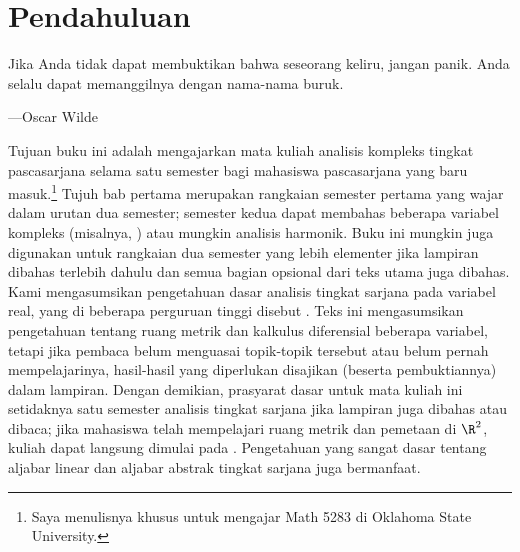 
\chapter*{Pendahuluan} \label{ch:intro}

\begin{myepigraph}
Jika Anda tidak dapat membuktikan bahwa seseorang keliru, jangan panik. Anda selalu dapat memanggilnya dengan nama-nama buruk.

---Oscar Wilde
\end{myepigraph}

Tujuan buku ini adalah mengajarkan mata kuliah analisis kompleks tingkat
pascasarjana selama satu semester bagi mahasiswa pascasarjana yang baru masuk.\footnote{Saya menulisnya khusus untuk mengajar Math 5283 di Oklahoma State University.}
Tujuh bab pertama merupakan rangkaian semester pertama yang wajar dalam
urutan dua semester; semester kedua dapat membahas beberapa variabel kompleks
(misalnya, \cite{scv:book}) atau mungkin analisis harmonik.
Buku ini mungkin juga digunakan untuk rangkaian dua semester yang lebih
elementer jika lampiran dibahas terlebih dahulu dan semua bagian opsional dari
teks utama juga dibahas.
Kami mengasumsikan pengetahuan dasar analisis tingkat sarjana pada variabel
real, yang di beberapa perguruan tinggi disebut .
Teks ini mengasumsikan pengetahuan tentang ruang metrik dan kalkulus
diferensial beberapa variabel, tetapi jika pembaca belum menguasai topik-topik
tersebut atau belum pernah mempelajarinya, hasil-hasil yang diperlukan
disajikan (beserta pembuktiannya) dalam lampiran.
Dengan demikian, prasyarat dasar untuk mata kuliah ini setidaknya satu
semester analisis tingkat sarjana jika lampiran juga dibahas atau dibaca; jika
mahasiswa telah mempelajari ruang metrik dan pemetaan di $\R^2$, kuliah dapat
langsung dimulai pada .
Pengetahuan yang sangat dasar tentang aljabar linear dan aljabar abstrak
tingkat sarjana juga bermanfaat.

